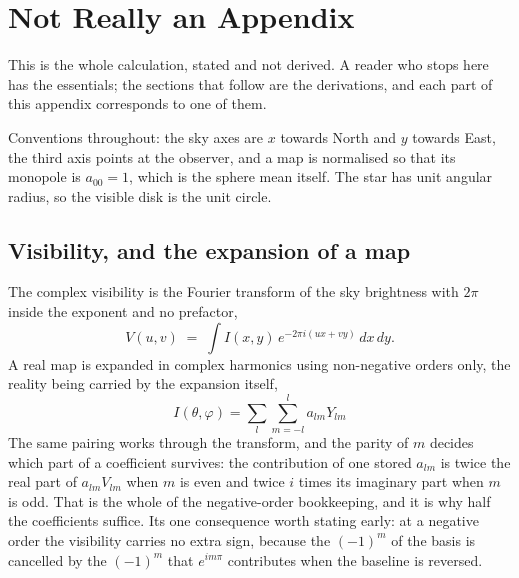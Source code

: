 

\appendix
\setcounter{equation}{0}
\renewcommand{\theequation}{A\arabic{equation}}
\section{Not Really an Appendix}
\label{sec:summary}

This is the whole calculation, stated and not derived.  A reader who stops here has the
essentials; the sections that follow are the derivations, and each part of this appendix
corresponds to one of them.

Conventions throughout: the sky axes are $x$ towards North and $y$ towards East, the third
axis points at the observer, and a map is normalised so that its monopole is $a_{00} = 1$,
which is the sphere mean itself.  The star has unit angular radius, so the
visible disk is the unit circle.

\subsection{Visibility, and the expansion of a map}

The complex visibility is the Fourier transform of the sky brightness with $2\pi$ inside the
exponent and no prefactor,
\begin{equation}
  V(u,v) \;=\; \int I(x,y)\, e^{-2\pi i (u x + v y)}\, dx\, dy .
  \label{eq:summary-visibility}
\end{equation}
A real map is expanded in complex harmonics using non-negative orders only, the reality
being carried by the expansion itself,
\begin{equation}
  I(\theta,\varphi) = \sum_{l} \sum_{m=-l}^{l} a_{lm}Y_{lm}
  \label{eq:summary-expansion}
\end{equation}
The same pairing works through the transform, and the parity of $m$ decides which part of a
coefficient survives: the contribution of one stored $a_{lm}$ is twice the real part of
$a_{lm}V_{lm}$ when $m$ is even and twice $i$ times its imaginary part when $m$ is odd.  That
is the whole of the negative-order bookkeeping, and it is why half the coefficients suffice.
Its one consequence worth stating early: at a negative order the visibility carries no extra
sign, because the $(-1)^m$ of the basis is cancelled by the $(-1)^m$ that $e^{im\pi}$
contributes when the baseline is reversed.

